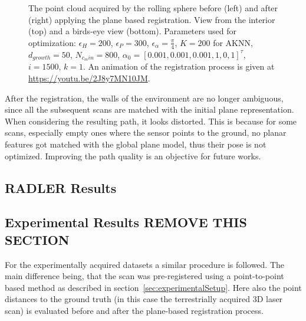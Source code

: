 \begin{figure}
        \caption{The point cloud acquired by the rolling sphere before (left) and after (right) applying the plane based registration. View from the interior (top) and a birds-eye view (bottom). Parameters used for optimization: $\epsilon_H = 200$, $\epsilon_P = 300$, $\epsilon_\alpha = \frac{\pi}{4}$, $K = 200$ for AKNN, $d_{growth} = 50$, $N_{c_min} = 800$, $\alpha_0 = [0.001, 0.001, 0.001, 1, 0, 1]^\tau$, $i = 1500$, $k = 1$. An animation of the registration process is given at \url{https://youtu.be/2J8y7MN10JM}.}
        \label{fig:jasperhome}
\end{figure}
After the registration, the walls of the environment are no longer ambiguous, since all the subsequent scans are matched with the initial plane representation.
When considering the resulting path, it looks distorted.
This is because for some scans, especially empty ones where the sensor points to the ground, no planar features got matched with the global plane model, thus their pose is not optimized.
Improving the path quality is an objective for future works.

\iffalse
	\subsection{RADLER Results}

	\subsection{Experimental Results REMOVE THIS SECTION}

	For the experimentally acquired datasets a similar procedure is followed. 
	The main difference being, that the scan was pre-registered using a point-to-point based method as described in section~\ref{sec:experimentalSetup}. 
	Here also the point distances to the ground truth (in this case the terrestrially acquired 3D laser scan) is evaluated before and after the plane-based registration process. 

